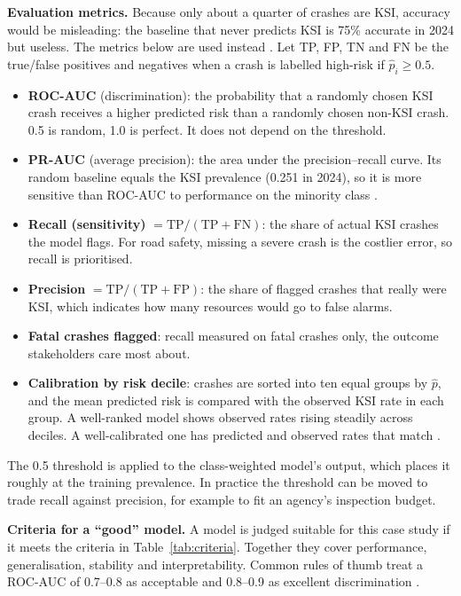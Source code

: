 \documentclass[11pt,a4paper]{article}
\begin{document}
\textbf{Evaluation metrics.} Because only about a quarter of crashes are KSI, accuracy would be misleading: the
baseline that never predicts KSI is 75\% accurate in 2024 but useless. The metrics below are used instead
\parencite{he2009,saito2015,fawcett2006}. Let TP, FP, TN and FN be the true/false positives and negatives when a
crash is labelled high-risk if $\hat{p}_i \geq 0.5$.
\begin{itemize}
  \item \textbf{ROC-AUC} (discrimination): the probability that a randomly chosen KSI crash receives a higher
        predicted risk than a randomly chosen non-KSI crash. 0.5 is random, 1.0 is perfect. It does not depend on
        the threshold.
  \item \textbf{PR-AUC} (average precision): the area under the precision--recall curve. Its random baseline equals
        the KSI prevalence (0.251 in 2024), so it is more sensitive than ROC-AUC to performance on the minority
        class \parencite{saito2015}.
  \item \textbf{Recall (sensitivity)} $= \text{TP}/(\text{TP}+\text{FN})$: the share of actual KSI crashes the model
        flags. For road safety, missing a severe crash is the costlier error, so recall is prioritised.
  \item \textbf{Precision} $= \text{TP}/(\text{TP}+\text{FP})$: the share of flagged crashes that really were KSI,
        which indicates how many resources would go to false alarms.
  \item \textbf{Fatal crashes flagged}: recall measured on fatal crashes only, the outcome stakeholders care
        most about.
  \item \textbf{Calibration by risk decile}: crashes are sorted into ten equal groups by $\hat{p}$, and the mean
        predicted risk is compared with the observed KSI rate in each group. A well-ranked model shows observed rates
        rising steadily across deciles. A well-calibrated one has predicted and observed rates that match
        \parencite{niculescu2005}.
\end{itemize}
The 0.5 threshold is applied to the class-weighted model's output, which places it roughly at the training
prevalence. In practice the threshold can be moved to trade recall against precision, for example to fit an
agency's inspection budget.

\textbf{Criteria for a \enquote{good} model.} A model is judged suitable for this case study if it meets the criteria
in Table~\ref{tab:criteria}. Together they cover performance, generalisation, stability and interpretability.
Common rules of thumb treat a ROC-AUC of 0.7--0.8 as acceptable and 0.8--0.9 as excellent discrimination
\parencite{hosmer2013}.
\end{document}
